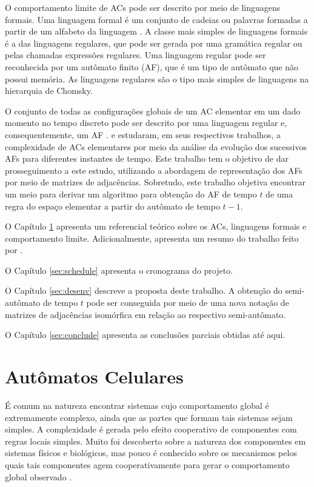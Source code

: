 \documentclass[12pt,a4paper]{article}
\begin{document}
O comportamento limite de ACs pode ser descrito por meio
de linguagens formais. Uma linguagem formal é um conjunto de cadeias ou
palavras formadas a partir de um alfabeto da linguagem
. A classe mais simples de linguagens formais é
a das linguagens regulares, que pode ser gerada por uma gramática regular ou
pelas chamadas expressões regulares. Uma linguagem regular pode ser
reconhecida por um autômato finito (AF), que é um tipo de autômato que
não possui memória. As linguagens regulares são o tipo mais simples
de linguagens na hierarquia de Chomsky.

O conjunto de todas as configurações globais de um AC
elementar em um dado momento no tempo discreto pode ser descrito por
uma linguagem regular e, consequentemente, um AF
.  e 
estudaram, em seus respectivos trabalhos, a complexidade de ACs
elementares por meio da análise da evolução dos sucessivos
AFs para diferentes instantes de tempo. Este trabalho
tem o objetivo de dar prosseguimento a este estudo, utilizando a abordagem
de representação dos AFs por meio de matrizes de adjacências.
Sobretudo, este trabalho objetiva encontrar um meio para derivar um
algoritmo para obtenção do AF de tempo $t$ de uma regra
do espaço elementar a partir do autômato de tempo $t-1$.

O Capítulo \ref{sec:refteo} apresenta um referencial teórico sobre 
os ACs, linguagens formais e comportamento limite.
Adicionalmente, apresenta um resumo do trabalho feito por
.

O Capítulo \ref{sec:schedule} apresenta o cronograma do projeto.

O Capítulo \ref{sec:desenv} descreve a proposta deste trabalho. A obtenção do
semi-autômato de tempo $t$ pode ser conseguida por meio de uma nova notação de 
matrizes de adjacências isomórfica em relação ao respectivo semi-autômato.

O Capítulo \ref{sec:conclude} apresenta as conclusões parciais obtidas até
aqui.

\newpage

\section{Autômatos Celulares}\label{sec:refteo}

É comum na natureza encontrar sistemas cujo comportamento global é extremamente
complexo, ainda que as partes que formam tais sistemas sejam simples. A
complexidade é gerada pelo efeito cooperativo de componentes com regras locais
simples. Muito foi descoberto sobre a natureza dos componentes em sistemas físicos
e biológicos, mas pouco é conhecido sobre os mecanismos pelos quais tais componentes
agem cooperativamente para gerar o comportamento global observado .
\end{document}
